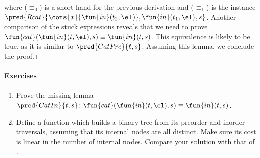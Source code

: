 where (\(\equiv_0\)) is a short\hyp{}hand for the previous derivation
and (\(\equiv_1\)) is the instance
\(\pred{Rcat}{\cons{x}{\fun{in}(t_2,\el)}, \fun{in}(t_1,\el),
  s}\). Another comparison of the stuck expressions reveals that we
need to prove \(\fun{cat}(\fun{in}(t,\el),s) \equiv
\fun{in}(t,s)\). This equivalence is likely to be true, as it is
similar to \(\pred{CatPre}{t,s}\).
Assuming this lemma, we conclude the proof.\hfill\(\Box\)

\paragraph{Exercises}
\begin{enumerate}

  \item Prove the missing lemma \(\pred{CatIn}{t,s} \colon
  \fun{cat}(\fun{in}(t,\el),s) \equiv
  \fun{in}(t,s)\).

  \item Define a function which builds a binary tree from its preorder
    and inorder traversals, assuming that its internal nodes are all
    distinct. Make sure its cost is linear in the number of internal
    nodes. Compare your solution with that of \cite{MuBird_2003}.

\end{enumerate}


